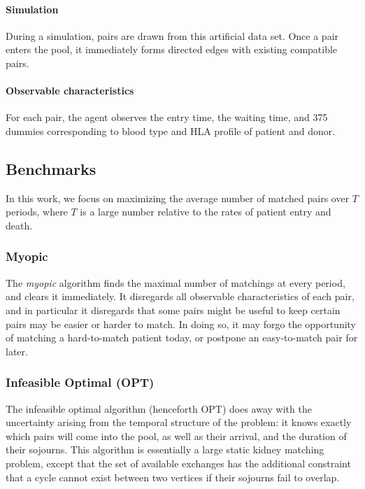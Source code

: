\documentclass[12pt]{article}
\begin{document}
\paragraph{Simulation} During a simulation, pairs are drawn from this artificial data set. Once a pair enters the pool, it immediately forms directed edges with existing compatible pairs.

\paragraph{Observable characteristics} For each pair, the agent observes the entry time, the waiting time, and 375 dummies corresponding to blood type and HLA profile of patient and donor. 




\subsection{Benchmarks}

In this work, we focus on maximizing the average number of matched pairs over $T$ periods, where $T$ is a large number relative to the rates of patient entry and death. 

\subsubsection{Myopic}

The \emph{myopic} algorithm finds the maximal number of matchings at every period, and clears it immediately. It disregards all observable characteristics of each pair, and in particular it disregards that some pairs might be useful to keep certain pairs may be easier or harder to match. In doing so, it may forgo the opportunity of matching a hard-to-match patient today, or postpone an easy-to-match pair for later.

\subsubsection{Infeasible Optimal (OPT)}

The infeasible optimal algorithm (henceforth OPT) does away with the uncertainty arising from the temporal structure of the problem: it knows exactly which pairs will come into the pool, as well as their arrival, and the duration of their sojourns. This algorithm is essentially a large static kidney matching problem, except that the set of available exchanges has the additional constraint that a cycle cannot exist between two vertices if their sojourns fail to overlap.
\end{document}
